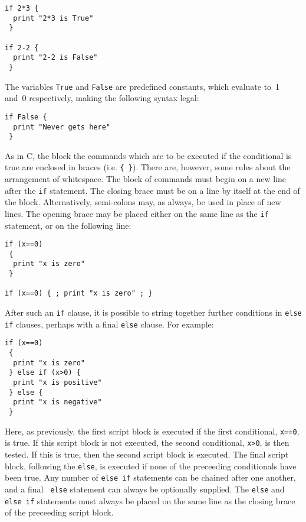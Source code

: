 \begin{verbatim}
if 2*3 {
  print "2*3 is True"
 }

if 2-2 {
  print "2-2 is False"
 }
\end{verbatim}

\noindent The variables {\tt True} and {\tt False} are predefined constants,
which evaluate to~1 and~0 respectively, making the following syntax legal:

\begin{verbatim}
if False {
  print "Never gets here"
 }
\end{verbatim}

As in C, the block the commands which are to be executed if the conditional is
true are enclosed in braces (i.e. {\tt \{~\}}).  There are, however, some rules
about the arrangement of whitespace.  The block of commands must begin on a new
line after the {\tt if} statement. The closing brace must be on a line by
itself at the end of the block. Alternatively, semi-colons may, as always, be
used in place of new lines. The opening brace may be placed either on the same
line as the {\tt if} statement, or on the following line:

\begin{verbatim}
if (x==0)
 {
  print "x is zero"
 }

if (x==0) { ; print "x is zero" ; }
\end{verbatim}

After such an {\tt if} clause, it is possible to string together further
conditions in {\tt else if} clauses, perhaps with a final {\tt else} clause.
For example:

\begin{verbatim}
if (x==0)
 {
  print "x is zero"
 } else if (x>0) {
  print "x is positive"
 } else {
  print "x is negative"
 }
\end{verbatim}

Here, as previously, the first script block is executed if the first
conditional, {\tt x==0}, is true. If this script block is not executed, the
second conditional, {\tt x>0}, is then tested. If this is true, then the second
script block is executed.  The final script block, following the {\tt else}, is
executed if none of the preceeding conditionals have been true. Any number of
{\tt else if} statements can be chained after one another, and a final {\tt
else} statement can always be optionally supplied. The {\tt else} and {\tt else
if} statements must always be placed on the same line as the closing brace of
the preceeding script block.

